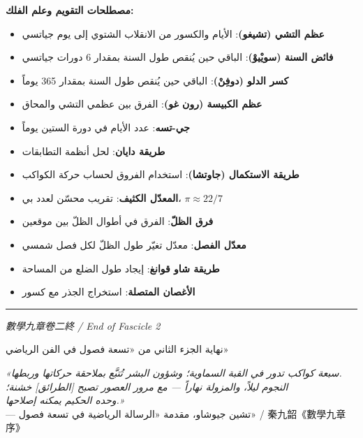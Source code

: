 \documentclass[11pt,a4paper]{article}
\newcommand{\longline}{\noindent\rule{\textwidth}{0.4pt}}
\begin{document}
\begin{minipage}[t]{0.48\textwidth}
\arabicfont\beginR
\textbf{مصطلحات التقويم وعلم الفلك:}
\begin{itemize}[leftmargin=1.5em]
  \item \textbf{عظم التشي (تشيغو)}: الأيام والكسور من الانقلاب الشتوي إلى يوم جياتسي
  \item \textbf{فائض السنة (سويْيوْ)}: الباقي حين يُنقص طول السنة بمقدار 6 دورات جياتسي
  \item \textbf{كسر الدلو (دوفِنْ)}: الباقي حين يُنقص طول السنة بمقدار 365 يوماً
  \item \textbf{عظم الكبيسة (رون غو)}: الفرق بين عظمي التشي والمحاق
  \item \textbf{جي-تسه}: عدد الأيام في دورة الستين يوماً
  \item \textbf{طريقة دايان}: لحل أنظمة التطابقات
  \item \textbf{طريقة الاستكمال (جاوتشا)}: استخدام الفروق لحساب حركة الكواكب
  \item \textbf{المعدّل الكثيف}: تقريب محسّن لعدد بي، $\pi \approx 22/7$
  \item \textbf{فرق الظلّ}: الفرق في أطوال الظلّ بين موقعين
  \item \textbf{معدّل الفصل}: معدّل تغيّر طول الظلّ لكل فصل شمسي
  \item \textbf{طريقة شاو قوانغ}: إيجاد طول الضلع من المساحة
  \item \textbf{الأغصان المتصلة}: استخراج الجذر مع كسور
\end{itemize}
\endR
\end{minipage}

\vspace{1cm}

\begin{center}
\longline

\textit{數學九章卷二終 / End of Fascicle 2}

\vspace{0.5cm}

{\arabicfont\beginR\large نهاية الجزء الثاني من «تسعة فصول في الفن الرياضي»\endR}

\vspace{0.5cm}

{\small\color{notecolor}
\textit{«سبعة كواكب تدور في القبة السماوية؛ وشؤون البشر تُتبَّع بملاحقة حركاتها وربطها.\\
النجوم ليلاً، والمزولة نهاراً — مع مرور العصور تصبح [الطرائق] خشنة؛\\
وحده الحكيم يمكنه إصلاحها.»}\\
--- تشين جيوشاو، مقدمة «الرسالة الرياضية في تسعة فصول» / 秦九韶《數學九章序》}
\end{center}
\end{document}
